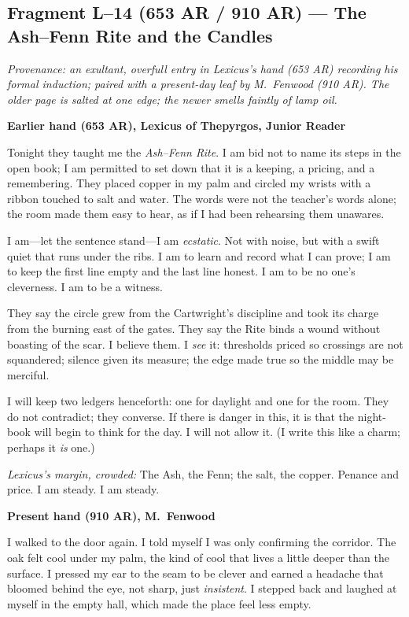 \documentclass[11pt]{article}
\begin{document}
\subsection*{Fragment L--14 (653 AR / 910 AR) --- The Ash--Fenn Rite and the Candles}
\label{frag:l14}
{}

\noindent\textit{Provenance: an exultant, overfull entry in Lexicus’s hand (653 AR) recording his formal induction; paired with a present-day leaf by M.\ Fenwood (910 AR). The older page is salted at one edge; the newer smells faintly of lamp oil.}

\medskip
\noindent\textbf{Earlier hand (653 AR), Lexicus of Thepyrgos, Junior Reader}

Tonight they taught me the \textit{Ash--Fenn Rite}. I am bid not to name its steps in the open book; I am permitted to set down that it is a keeping, a pricing, and a remembering. They placed copper in my palm and circled my wrists with a ribbon touched to salt and water. The words were not the teacher’s words alone; the room made them easy to hear, as if I had been rehearsing them unawares.

I am—let the sentence stand—I am \emph{ecstatic}. Not with noise, but with a swift quiet that runs under the ribs. I am to learn and record what I can prove; I am to keep the first line empty and the last line honest. I am to be no one’s cleverness. I am to be a witness.

They say the circle grew from the Cartwright’s discipline and took its charge from the burning east of the gates. They say the Rite binds a wound without boasting of the scar. I believe them. I \emph{see} it: thresholds priced so crossings are not squandered; silence given its measure; the edge made true so the middle may be merciful.

I will keep two ledgers henceforth: one for daylight and one for the room. They do not contradict; they converse. If there is danger in this, it is that the night-book will begin to think for the day. I will not allow it. (I write this like a charm; perhaps it \emph{is} one.)

\medskip
\noindent\textit{Lexicus’s margin, crowded:} The Ash, the Fenn; the salt, the copper. Penance and price. I am steady. I am steady.

\medskip
\noindent\textbf{Present hand (910 AR), M.\ Fenwood}

I walked to the door again. I told myself I was only confirming the corridor. The oak felt cool under my palm, the kind of cool that lives a little deeper than the surface. I pressed my ear to the seam to be clever and earned a headache that bloomed behind the eye, not sharp, just \emph{insistent}. I stepped back and laughed at myself in the empty hall, which made the place feel less empty.
\end{document}
